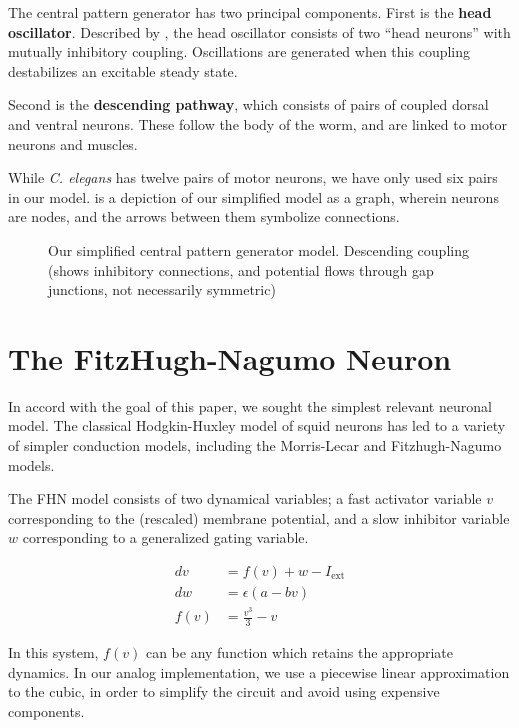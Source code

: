 \documentclass[
    11pt,
]{article}
\begin{document}
The central pattern generator has two principal components.  First is the \textbf{head oscillator}. Described by \citet{gjorgjieva2014}, the head oscillator consists of two “head neurons” with mutually inhibitory coupling.  Oscillations are generated when this coupling destabilizes an excitable steady state.

Second is the \textbf{descending pathway}, which consists of pairs of coupled dorsal and ventral neurons.  These follow the body of the worm, and are linked to motor neurons and muscles.

While \textit{C. elegans} has twelve pairs of motor neurons, we have only used six pairs in our model.   is a depiction of our simplified model as a graph, wherein neurons are nodes, and the arrows between them symbolize connections.

\begin{figure}[h!]
    \label{fig: cpg}
    \centering
    \caption{Our simplified central pattern generator model.  Descending coupling (shows inhibitory connections, and potential flows through gap junctions, not necessarily symmetric)}
\end{figure} %

\section{The FitzHugh-Nagumo Neuron}\label{sec: fhn}

In accord with the goal of this paper, we sought the simplest relevant neuronal model.  The classical Hodgkin-Huxley\cite{hodgkin1952} model of squid neurons has led to a variety of simpler conduction models, including the Morris-Lecar\cite{morris1981} and Fitzhugh-Nagumo models.

The FHN model consists of two dynamical variables; a fast activator variable $v$ corresponding to the (rescaled) membrane potential, and a slow inhibitor variable $w$ corresponding to a generalized gating variable.

\begin{equation}
    \label{eq: fhn}
    \begin{aligned}
        dv &= f(v) + w - I_\mathrm{ext}\\
        dw &= ϵ(a - bv)\\
        f(v) &= \frac{v^3}{3} - v
    \end{aligned}
\end{equation}

In this system, $f(v)$ can be any function which retains the appropriate dynamics.  In our analog implementation, we use a piecewise linear approximation to the cubic, in order to simplify the circuit and avoid using expensive components.
\end{document}
